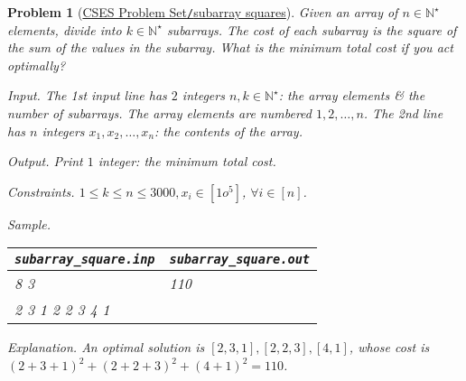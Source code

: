 \documentclass{article}
\newtheorem{problem}{Problem}
\begin{document}
\begin{problem}[\href{https://cses.fi/problemset/task/2086}{CSES Problem Set{\tt/}subarray squares}]
    Given an array of $n\in\mathbb{N}^\star$ elements, divide into $k\in\mathbb{N}^\star$ subarrays. The cost of each subarray is the square of the sum of the values in the subarray. What is the minimum total cost if you act optimally?
    \item {\sf Input.} The 1st input line has $2$ integers $n,k\in\mathbb{N}^\star$: the array elements \& the number of subarrays. The array elements are numbered $1,2,\ldots,n$. The 2nd line has $n$ integers $x_1,x_2,\ldots,x_n$: the contents of the array.
    \item {\sf Output.} Print $1$ integer: the minimum total cost.
    \item {\sf Constraints.} $1\le k\le n\le3000,x_i\in[1o^5]$, $\forall i\in[n]$.
    \item {\sf Sample.}
    \begin{table}[H]
        \centering
        \begin{tabular}{|l|l|}
            \hline
            \verb|subarray_square.inp| & \verb|subarray_square.out| \\
            \hline
            8 3 & 110 \\
            2 3 1 2 2 3 4 1 & \\
            \hline
        \end{tabular}
    \end{table}
    \item {\sf Explanation.} An optimal solution is $[2,3,1],[2,2,3],[4,1]$, whose cost is $(2 + 3 + 1)^2 + (2 + 2 + 3)^2 + (4 + 1)^2 = 110$.
\end{problem}
\end{document}
